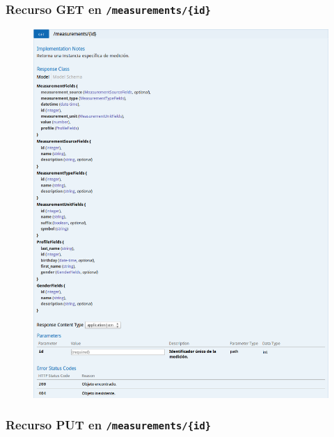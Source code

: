 \newpage


\subsubsection{Recurso GET en \texttt{/measurements/\{id\}}}

\begin{figure}[h]
  \centering
  \includegraphics[width=\textwidth,height=.75\textheight,keepaspectratio]{img/especificacion_api/measurementView_get}
  \label{measurementView_get}
\end{figure}

\newpage


\subsubsection{Recurso PUT en \texttt{/measurements/\{id\}}}

